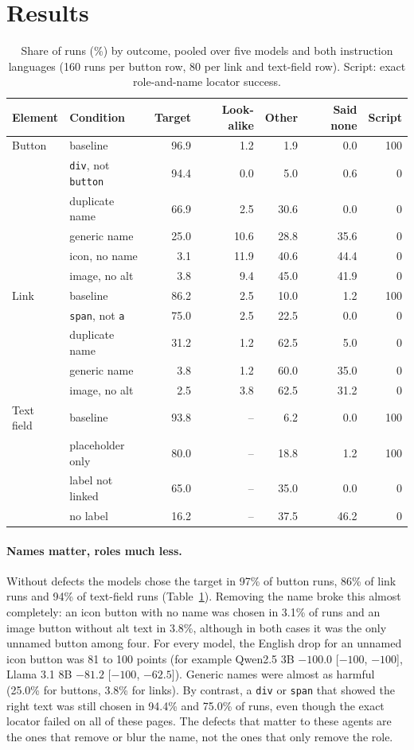 \documentclass[11pt]{article}
\begin{document}
\section{Results}
\begin{table}[t]
\centering
\small
\begin{tabular}{llrrrrr}
\toprule
Element & Condition & Target & Look-alike & Other & Said none & Script \\
\midrule
Button & baseline & 96.9 & 1.2 & 1.9 & 0.0 & 100 \\
 & \texttt{div}, not \texttt{button} & 94.4 & 0.0 & 5.0 & 0.6 & 0 \\
 & duplicate name & 66.9 & 2.5 & 30.6 & 0.0 & 0 \\
 & generic name & 25.0 & 10.6 & 28.8 & 35.6 & 0 \\
 & icon, no name & 3.1 & 11.9 & 40.6 & 44.4 & 0 \\
 & image, no alt & 3.8 & 9.4 & 45.0 & 41.9 & 0 \\
\midrule
Link & baseline & 86.2 & 2.5 & 10.0 & 1.2 & 100 \\
 & \texttt{span}, not \texttt{a} & 75.0 & 2.5 & 22.5 & 0.0 & 0 \\
 & duplicate name & 31.2 & 1.2 & 62.5 & 5.0 & 0 \\
 & generic name & 3.8 & 1.2 & 60.0 & 35.0 & 0 \\
 & image, no alt & 2.5 & 3.8 & 62.5 & 31.2 & 0 \\
\midrule
Text field & baseline & 93.8 & -- & 6.2 & 0.0 & 100 \\
 & placeholder only & 80.0 & -- & 18.8 & 1.2 & 100 \\
 & label not linked & 65.0 & -- & 35.0 & 0.0 & 0 \\
 & no label & 16.2 & -- & 37.5 & 46.2 & 0 \\
\bottomrule
\end{tabular}
\caption{Share of runs (\%) by outcome, pooled over five models and both instruction languages (160 runs per button row, 80 per link and text-field row). Script: exact role-and-name locator success.}
\label{tab:pooled}
\end{table}

\paragraph{Names matter, roles much less.} Without defects the models chose the target in 97\% of button runs, 86\% of link runs and 94\% of text-field runs (Table~\ref{tab:pooled}). Removing the name broke this almost completely: an icon button with no name was chosen in 3.1\% of runs and an image button without alt text in 3.8\%, although in both cases it was the only unnamed button among four. For every model, the English drop for an unnamed icon button was 81 to 100 points (for example Qwen2.5 3B $-100.0$ [$-100$, $-100$], Llama 3.1 8B $-81.2$ [$-100$, $-62.5$]). Generic names were almost as harmful (25.0\% for buttons, 3.8\% for links). By contrast, a \texttt{div} or \texttt{span} that showed the right text was still chosen in 94.4\% and 75.0\% of runs, even though the exact locator failed on all of these pages. The defects that matter to these agents are the ones that remove or blur the name, not the ones that only remove the role.
\end{document}
